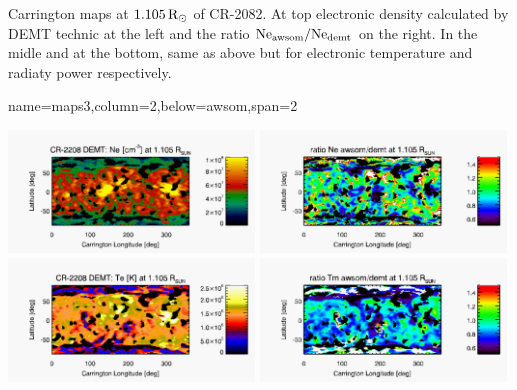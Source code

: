 \documentclass[paperwidth=100cm,paperheight=120cm]{baposter}
\def\azul#1{\textcolor{blue}{#1}}
\begin{document}
\begin{poster}
{\begin{center}
\end{center}
\vskip -0.16cm
{\footnotesize\sf
Carrington maps at $1.105\, {\rm R}_\odot$  of CR-2082. At top electronic density calculated by DEMT technic at the left and the ratio ${\rm Ne_{awsom}/Ne_{demt}}$ on the right. In the midle and at the bottom, same as above but for electronic temperature and radiaty power respectively.
}
}

{name=maps3,column=2,below=awsom,span=2}{
{\footnotesize\sf
\begin{center}
{\includegraphics[width=0.49\textwidth]{map_Ne_CR2208_DEMT-AIA_H1_L522_r3d_1105_Rsun.pdf}}
{\includegraphics[width=0.49\textwidth]{map_ratio_Ne_awsom_2208_185-Ne_CR2208_DEMT-AIA_H1_L522_r3d_1105_Rsun.pdf}}
{\includegraphics[width=0.49\textwidth]{map_Tm_CR2208_DEMT-AIA_H1_L522_r3d_1105_Rsun.pdf}}
{\includegraphics[width=0.49\textwidth]{map_ratio_Te_awsom_2208_185-Tm_CR2208_DEMT-AIA_H1_L522_r3d_1105_Rsun.pdf}}

\end{center}}}
\end{poster}
\end{document}
